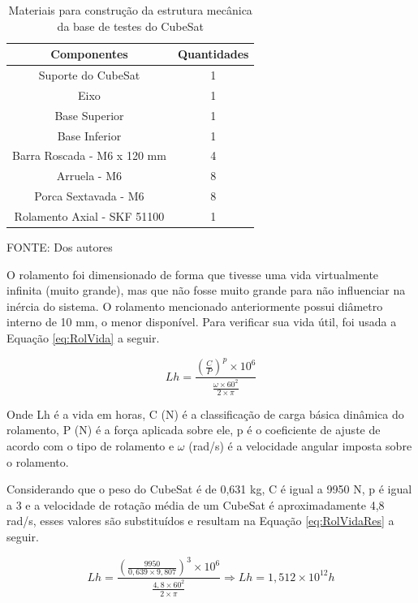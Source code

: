 \documentclass[
	12pt,				%
	openany,			%
	twoside,			%
	a4paper,			%
	english,			%
	french,				%
	spanish,			%
	brazil,				%
	oldfontcommands
	]{abntex2}
\begin{document}
\begin{table}[h]
	\caption{Materiais para construção da estrutura mecânica da base de testes do CubeSat}
		\centering
	\begin{tabular}{|c|c|}
		\hline
		\textbf{Componentes} & \textbf{Quantidades} \\ 
		\hline 
		Suporte do CubeSat & 1 \\ 
		\hline 
		Eixo & 1 \\
		\hline
		Base Superior & 1 \\ 
		\hline 
		Base Inferior & 1 \\
		\hline 
		Barra Roscada - M6 x 120 mm & 4 \\
		\hline 
		Arruela - M6 & 8 \\ 
		\hline 
		Porca Sextavada - M6 & 8 \\ 
		\hline 
		Rolamento Axial - SKF 51100 & 1 \\
		\hline
	\end{tabular}
	
	\begin{small}
	\vspace{3pt}	
	FONTE: Dos autores
	\end{small}
	\label{tab:MatTB}
\end{table}

O rolamento foi dimensionado de forma que tivesse uma vida virtualmente infinita (muito grande), mas que não fosse muito grande para não influenciar na inércia do sistema. O rolamento mencionado anteriormente possui diâmetro interno de 10 mm, o menor disponível. Para verificar sua vida útil, foi usada a Equação \ref{eq:RolVida} a seguir.

\begin{equation}
Lh = \frac{ \left( \frac{C}{P} \right)^{p} \times 10^{6}}{\frac{\omega \times 60^{2}}{2 \times \pi}}
\label{eq:RolVida}
\end{equation}

Onde Lh é a vida em horas, C (N) é a classificação de carga básica dinâmica do rolamento, P (N) é a força aplicada sobre ele, p é o coeficiente de ajuste de acordo com o tipo de rolamento e $\omega$ (rad/s) é a velocidade angular imposta sobre o rolamento.

Considerando que o peso do CubeSat é de 0,631 kg, C é igual a 9950 N, p é igual a 3 e a velocidade de rotação média de um CubeSat é aproximadamente 4,8 rad/s, esses valores são substituídos e resultam na Equação \ref{eq:RolVidaRes} a seguir.

\begin{equation}
Lh = \frac{ \left( \frac{9950}{0,639 \times 9,807 } \right)^{3} \times 10^{6}}{\frac{4,8 \times 60^{2}}{2 \times \pi}} \Longrightarrow Lh = 1,512 \times 10^{12} h
\label{eq:RolVidaRes}
\end{equation}
\end{document}
